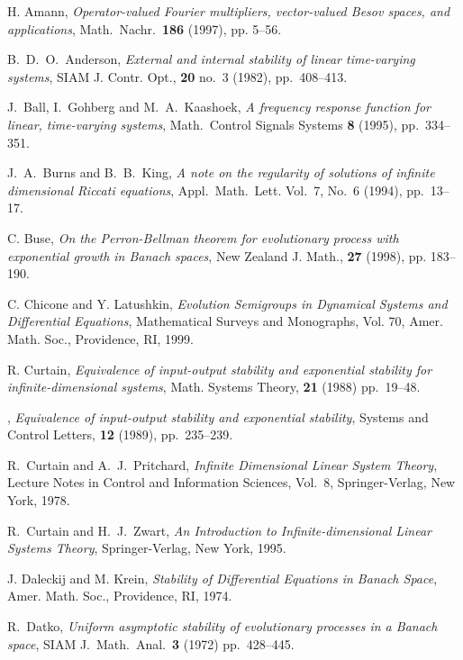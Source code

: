 \documentclass[10pt,psamsfonts,leqno]{siamltex}
\begin{document}
\begin{thebibliography}{99}

 {\sc H. Amann},
{\em Operator-valued Fourier multipliers, vector-valued Besov spaces,
and
applications},  Math.~Nachr.~{\bf 186} (1997), pp. 5--56.


 {\sc B.~D.~O.~Anderson}, {\em External and internal
stability of
linear time-varying systems},  SIAM J. Contr. Opt., {\bf 20} no.~3
(1982), pp.~408--413.

 {\sc J.~Ball, I.~Gohberg and M.~A.~Kaashoek}, {\em A
frequency
response function for linear, time-varying systems}, Math.~Control
Signals Systems {\bf 8} (1995), pp.~334--351.

 {\sc J.~A.~Burns and B.~B.~King}, {\em A note on the
regularity of
solutions of infinite dimensional Riccati equations},
Appl.~Math.~Lett. Vol.~7, No.~6 (1994), pp.~13--17.

 {\sc C. Buse}, {\em On the
Perron-Bellman theorem for
evolutionary process with exponential
growth in Banach spaces},  New
Zealand J. Math., {\bf 27} (1998), pp. 183--190.

 {\sc C. Chicone and Y. Latushkin},
{\em Evolution Semigroups in Dynamical Systems
and Differential Equations},
Mathematical Surveys and Monographs, Vol. 70,
Amer. Math. Soc., Providence, RI, 1999.

 {\sc R. Curtain}, {\em Equivalence of input-output
stability and
exponential stability for infinite-dimensional systems},
Math. Systems Theory, {\bf 21} (1988) pp.~19--48.

 \sameauthor,
{\em Equivalence of input-output stability and
exponential stability}, Systems and Control Letters, {\bf 12}
(1989), pp.~235--239.

 {\sc R.~Curtain and A.~J.~Pritchard},
{\em Infinite Dimensional Linear System Theory},
Lecture Notes in Control and Information Sciences, Vol.~8,
Springer-Verlag, New York, 1978.

 {\sc R.~Curtain and H.~J.~Zwart}, {\em An Introduction to
Infinite-dimensional Linear Systems Theory}, Springer-Verlag,
 New York, 1995.

 {\sc J. Daleckij and M. Krein},
{\em Stability of Differential Equations in Banach Space},
Amer. Math. Soc., Providence, RI, 1974.

 {\sc R.~Datko}, {\em Uniform
asymptotic stability of evolutionary
processes in a Banach space},
SIAM J.~Math.~Anal.~{\bf 3} (1972)
pp.~428--445.


\end{thebibliography}
\end{document}
